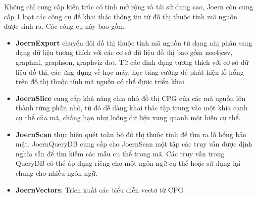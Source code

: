 Không chỉ cung cấp kiến trúc có tính mở rộng và tái sử dụng cao, Joern còn cung cấp 1 loạt các công cụ để khai thác thông tin từ đồ thị thuộc tính mã nguồn được sinh ra. Các công cụ này bao gồm:

\begin{itemize}
  \item \textbf{JoernExport} chuyển đổi đồ thị thuộc tính mã nguồn từ dạng nhị phân sang dạng dữ liệu tương thích với các cơ sở dữ liệu đồ thị bao gồm neo4jcsv, graphml, graphson, graphviz dot. Từ các định dạng tương thích với cơ sở dữ liệu đồ thị, các ứng dụng về học máy, học tăng cường để phát hiện lỗ hổng trên đồ thị thuộc tính mã nguồn có thể được triển khai \cite{zhou2019devign, alsulami2017source, li2016vulpecker, dauber2018git, machiry2020spider}
  \item \textbf{JoernSlice} cung cấp khả năng chia nhỏ đồ thị CPG của các mã nguồn lớn thành từng phần nhỏ, từ đó dễ dàng khai thác tập trung vào một khía cạnh cụ thể của mã, chẳng hạn như luồng dữ liệu xung quanh một biến cụ thể.
  \item \textbf{JoernScan} thực hiện quét toàn bộ đồ thị thuộc tính để tìm ra lỗ hổng bảo mật. JoernQueryDB \cite{joernJoernQuery} cung cấp cho JoernScan một tập các truy vấn được định nghĩa sẵn để tìm kiếm các mẫu cụ thể trong mã. Các truy vấn trong QueryDB có thể áp dụng riêng cho một ngôn ngữ cụ thể hoặc sử dụng lại chung cho nhiều ngôn ngữ.
  \item \textbf{JoernVectors}: Trích xuất các biểu diễn vectơ từ CPG
\end{itemize}
